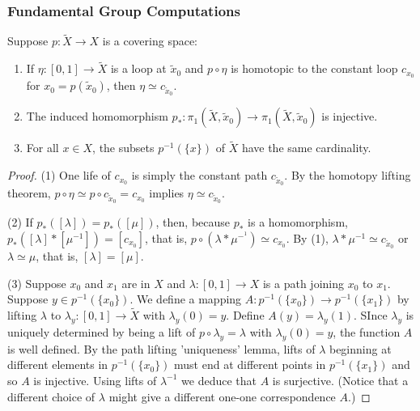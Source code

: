 \subsubsection{Fundamental Group Computations}\label{fundamentalgroupcomputations}

\begin{corollary}
Suppose $p : \tilde X \rightarrow X$ is a covering space:
\begin{enumerate}
  \item If $\eta : [0,1] \rightarrow \tilde X$ is a loop at $\tilde x_0$ and $p \circ \eta$ is homotopic to the constant loop $c_{x_0}$ for $x_0 = p(\tilde x_0)$, then $\eta \simeq c_{\tilde x_0}$.
  \item The induced homomorphism $p_{*} : \pi_1(\tilde X, \tilde x_0) \rightarrow \pi_1(\tilde X, \tilde x_0)$ is injective.
  \item For all $x \in X$, the subsets $p^{-1}(\{x\})$ of $\tilde X$ have the same cardinality.
\end{enumerate}
\end{corollary}

\begin{proof}
(1) One life of $c_{x_0}$ is simply the constant path $c_{\tilde x_0}$. By the homotopy lifting theorem,
$p \circ \eta \simeq p \circ c_{\tilde x_0} = c_{x_0}$ implies $\eta \simeq c_{\tilde x_0}.$

(2) If $p_*([\lambda]) = p_*([\mu])$, then, because $p_*$ is a homomorphism, $p_*([\lambda] * [\mu^{-1}]) = [c_{x_0}]$, that is,
$p \circ (\lambda * \mu^{-^1}) \simeq c_{x_0}$. By (1), $\lambda * \mu^{-1} \simeq c_{\tilde x_0}$ or $\lambda \simeq \mu$, that is,
$[\lambda] = [\mu]$.

(3) Suppose $x_0$ and $x_1$ are in $X$ and $\lambda : [0,1] \rightarrow X$ is a path joining $x_0$ to $x_1$. Suppose $y \in p^{-1}(\{x_0\}).$ We define
a mapping $A : p^{-1}(\{ x_0 \}) \rightarrow p^{-1}(\{ x_1 \})$ by lifting $\lambda$ to $\lambda_y : [0,1] \rightarrow \tilde X$ with $\lambda_y(0) = y$.
Define $A(y) = \lambda_y(1)$. SInce $\lambda_y$ is uniquely determined by being a lift of $p \circ \lambda_y = \lambda$ with $\lambda_y(0) = y$, the function $A$ is well defined.
By the path lifting 'uniqueness' lemma, lifts of $\lambda$ beginning at different elements in $p^{-1}(\{ x_0 \})$ must end at different points in $p^{-1}(\{ x_1 \})$ and so $A$ is injective.
Using lifts of $\lambda^{-1}$ we deduce that $A$ is surjective. (Notice that a different choice of $\lambda$ might give a different one-one correspondence $A$.)
\end{proof}